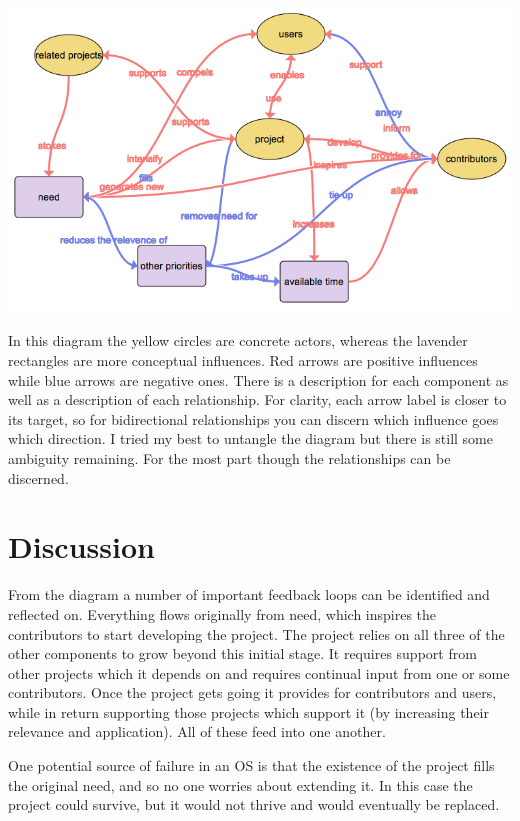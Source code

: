 \documentclass[10pt]{article}
\begin{document}
\begin{center}
\includegraphics[scale=0.6]{clear.png}
\end{center}

In this diagram the yellow circles are concrete actors, whereas the lavender rectangles are more conceptual influences.  Red arrows are positive influences while blue arrows are negative ones.  There is a description for each component as well as a description of each relationship.  For clarity, each arrow label is closer to its target, so for bidirectional relationships you can discern which influence goes which direction.  I tried my best to untangle the diagram but there is still some ambiguity remaining.  For the most part though the relationships can be discerned.

\section{Discussion}

From the diagram a number of important feedback loops can be identified and reflected on.  Everything flows originally from need, which inspires the contributors to start developing the project.  The project relies on all three of the other components to grow beyond this initial stage.  It requires support from other projects which it depends on and requires continual input from one or some contributors.  Once the project gets going it provides for contributors and users, while in return supporting those projects which support it (by increasing their relevance and application).  All of these feed into one another.

One potential source of failure in an OS is that the existence of the project fills the original need, and so no one worries about extending it.  In this case the project could survive, but it would not thrive and would eventually be replaced.
\end{document}
